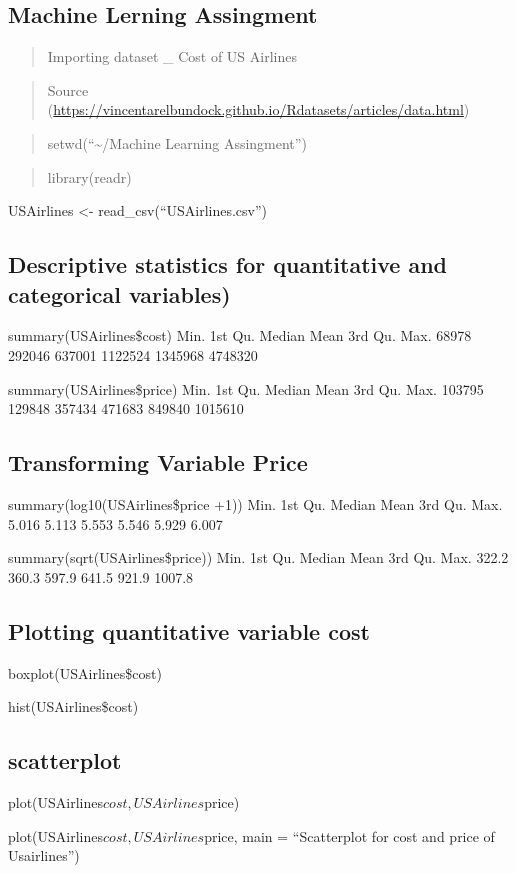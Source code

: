 \documentclass[
]{article}
\author{}
\date{\vspace{-2.5em}}
\begin{document}
\hypertarget{machine-lerning-assingment}{%
\subsection{Machine Lerning
Assingment}\label{machine-lerning-assingment}}

\begin{quote}
Importing dataset \_ Cost of US Airlines
\end{quote}

\begin{quote}
Source
(\url{https://vincentarelbundock.github.io/Rdatasets/articles/data.html})
\end{quote}

\begin{quote}
setwd(``\textasciitilde/Machine Learning Assingment'')
\end{quote}

\begin{quote}
library(readr)
\end{quote}

USAirlines \textless- read\_csv(``USAirlines.csv'')

\hypertarget{descriptive-statistics-for-quantitative-and-categorical-variables}{%
\subsection{Descriptive statistics for quantitative and categorical
variables)}\label{descriptive-statistics-for-quantitative-and-categorical-variables}}

summary(USAirlines\$cost) Min. 1st Qu. Median Mean 3rd Qu. Max. 68978
292046 637001 1122524 1345968 4748320

summary(USAirlines\$price) Min. 1st Qu. Median Mean 3rd Qu. Max. 103795
129848 357434 471683 849840 1015610

\hypertarget{transforming-variable-price}{%
\subsection{Transforming Variable
Price}\label{transforming-variable-price}}

summary(log10(USAirlines\$price +1)) Min. 1st Qu. Median Mean 3rd Qu.
Max. 5.016 5.113 5.553 5.546 5.929 6.007

summary(sqrt(USAirlines\$price)) Min. 1st Qu. Median Mean 3rd Qu. Max.
322.2 360.3 597.9 641.5 921.9 1007.8

\hypertarget{plotting-quantitative-variable-cost}{%
\subsection{Plotting quantitative variable
cost}\label{plotting-quantitative-variable-cost}}

boxplot(USAirlines\$cost)

hist(USAirlines\$cost)

\hypertarget{scatterplot}{%
\subsection{scatterplot}\label{scatterplot}}

plot(USAirlines\(cost, USAirlines\)price)

plot(USAirlines\(cost, USAirlines\)price, main = ``Scatterplot for cost
and price of Usairlines'')
\end{document}
